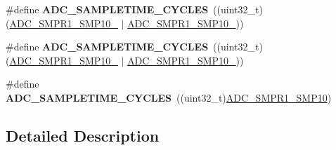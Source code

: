 \begin{DoxyCompactItemize}
\item 
\#define {\bfseries A\+D\+C\+\_\+\+S\+A\+M\+P\+L\+E\+T\+I\+M\+E\+\_\+C\+Y\+C\+L\+ES}~((uint32\+\_\+t)(\hyperlink{group___peripheral___registers___bits___definition_ga289d89b4d92d7f685a8e44aeb9ddcded}{A\+D\+C\+\_\+\+S\+M\+P\+R1\+\_\+\+S\+M\+P10\+\_} $\vert$ \hyperlink{group___peripheral___registers___bits___definition_ga8a8996c53042759f01e966fb00351ebf}{A\+D\+C\+\_\+\+S\+M\+P\+R1\+\_\+\+S\+M\+P10\+\_}))\hypertarget{group___a_d_c__sampling__times_ga37d00fbf996e8995c5dd46fc992f027c}{}\label{group___a_d_c__sampling__times_ga37d00fbf996e8995c5dd46fc992f027c}

\item 
\#define {\bfseries A\+D\+C\+\_\+\+S\+A\+M\+P\+L\+E\+T\+I\+M\+E\+\_\+C\+Y\+C\+L\+ES}~((uint32\+\_\+t)(\hyperlink{group___peripheral___registers___bits___definition_ga289d89b4d92d7f685a8e44aeb9ddcded}{A\+D\+C\+\_\+\+S\+M\+P\+R1\+\_\+\+S\+M\+P10\+\_} $\vert$ \hyperlink{group___peripheral___registers___bits___definition_ga42b96f058436c8bdcfabe1e08c7edd61}{A\+D\+C\+\_\+\+S\+M\+P\+R1\+\_\+\+S\+M\+P10\+\_}))\hypertarget{group___a_d_c__sampling__times_ga383fd99e5566555e7f0c249e036c5ccb}{}\label{group___a_d_c__sampling__times_ga383fd99e5566555e7f0c249e036c5ccb}

\item 
\#define {\bfseries A\+D\+C\+\_\+\+S\+A\+M\+P\+L\+E\+T\+I\+M\+E\+\_\+C\+Y\+C\+L\+ES}~((uint32\+\_\+t)\hyperlink{group___peripheral___registers___bits___definition_ga32242a2c2156a012a7343bcb43d490d0}{A\+D\+C\+\_\+\+S\+M\+P\+R1\+\_\+\+S\+M\+P10})\hypertarget{group___a_d_c__sampling__times_gaa39649d790cb2ca115171db71604652d}{}\label{group___a_d_c__sampling__times_gaa39649d790cb2ca115171db71604652d}

\end{DoxyCompactItemize}


\subsection{Detailed Description}
